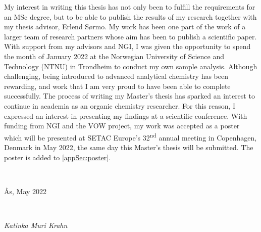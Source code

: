 My interest in writing this thesis has not only been to fulfill the requirements for an MSc degree, but to be able to publish the results of my research together with my thesis advisor, Erlend S\o rmo. My work has been one part of the work of a larger team of research partners whose aim has been to publish a scientific paper. With support from my advisors and NGI, I was given the opportunity to spend the month of January 2022 at the Norwegian University of Science and Technology (NTNU) in Trondheim to conduct my own sample analysis. Although challenging, being introduced to advanced analytical chemistry has been rewarding, and work that I am very proud to have been able to complete successfully. The process of writing my Master's thesis has sparked an interest to continue in academia as an organic chemistry researcher. For this reason, I expressed an interest in presenting my findings at a scientific conference. With funding from NGI and the VOW project, my work was accepted as a poster which will be presented at SETAC Europe's 32\textsuperscript{nd} annual meeting in Copenhagen, Denmark in May 2022, the same day this Master's thesis will be submitted. The poster is added to \cref{appSec:poster}.  

~\\
\centerline{Ås, May 2022} \\
\centerline{\textit{Katinka Muri Krahn}}



